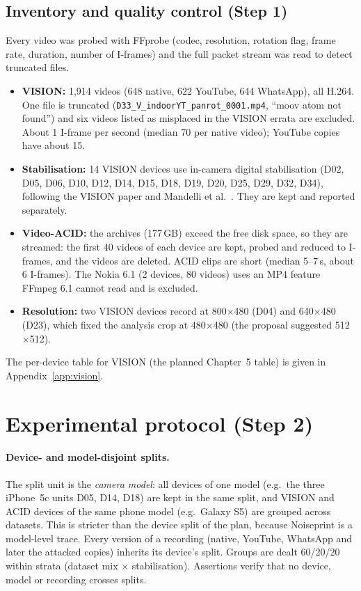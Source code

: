 \documentclass[11pt,a4paper]{article}
\begin{document}
\subsection{Inventory and quality control (Step 1)}
Every video was probed with FFprobe (codec, resolution, rotation flag, frame rate, duration, number of
I-frames) and the full packet stream was read to detect truncated files.

\begin{itemize}
  \item \textbf{VISION:} 1{,}914 videos (648 native, 622 YouTube, 644 WhatsApp), all H.264.
        One file is truncated (\texttt{D33\_V\_indoorYT\_panrot\_0001.mp4}, ``moov atom not found'')
        and six videos listed as misplaced in the VISION errata are excluded.
        About 1 I-frame per second (median 70 per native video); YouTube copies have about 15.
  \item \textbf{Stabilisation:} 14 VISION devices use in-camera digital stabilisation
        (D02, D05, D06, D10, D12, D14, D15, D18, D19, D20, D25, D29, D32, D34), following the VISION
        paper and Mandelli et al.~\cite{mandelli}. They are kept and reported separately.
  \item \textbf{Video-ACID:} the archives (177\,GB) exceed the free disk space, so they are streamed:
        the first 40 videos of each device are kept, probed and reduced to I-frames, and the videos are
        deleted. ACID clips are short (median 5--7\,s, about 6 I-frames). The Nokia 6.1 (2 devices,
        80 videos) uses an MP4 feature FFmpeg 6.1 cannot read and is excluded.
  \item \textbf{Resolution:} two VISION devices record at 800$\times$480 (D04) and 640$\times$480 (D23),
        which fixed the analysis crop at 480$\times$480 (the proposal suggested 512$\times$512).
\end{itemize}
The per-device table for VISION (the planned Chapter~5 table) is given in Appendix~\ref{app:vision}.

\section{Experimental protocol (Step 2)}

\paragraph{Device- and model-disjoint splits.} The split unit is the \emph{camera model}: all devices
of one model (e.g.\ the three iPhone~5c units D05, D14, D18) are kept in the same split, and VISION and
ACID devices of the same phone model (e.g.\ Galaxy S5) are grouped across datasets. This is stricter
than the device split of the plan, because Noiseprint is a model-level trace. Every version of a
recording (native, YouTube, WhatsApp and later the attacked copies) inherits its device's split.
Groups are dealt 60/20/20 within strata (dataset mix $\times$ stabilisation). Assertions verify that no
device, model or recording crosses splits.
\end{document}
